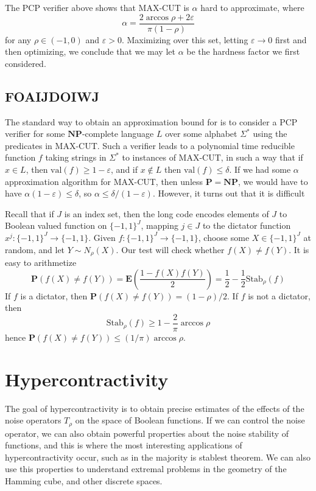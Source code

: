 The PCP verifier above shows that MAX-CUT is $\alpha$ hard to approximate, where
%
\[ \alpha = \frac{2 \arccos \rho + 2\varepsilon}{\pi(1 - \rho)} \]
%
for any $\rho \in (-1,0)$ and $\varepsilon > 0$. Maximizing over this set, letting $\varepsilon \to 0$ first and then optimizing, we conclude that we may let $\alpha$ be the hardness factor we first considered.


\section{FOAIJDOIWJ}

The standard way to obtain an approximation bound for is to consider a PCP verifier for some $\mathbf{NP}$-complete language $L$ over some alphabet $\Sigma^*$ using the predicates in MAX-CUT. Such a verifier leads to a polynomial time reducible function $f$ taking strings in $\Sigma^*$ to instances of MAX-CUT, in such a way that if $x \in L$, then $\text{val}(f) \geq 1 - \varepsilon$, and if $x \not \in L$ then $\text{val}(f) \leq \delta$. If we had some $\alpha$ approximation algorithm for MAX-CUT, then unless $\mathbf{P} = \mathbf{NP}$, we would have to have $\alpha (1 - \varepsilon) \leq \delta$, so $\alpha \leq \delta/(1-\varepsilon)$. However, it turns out that it is difficult

Recall that if $J$ is an index set, then the long code encodes elements of $J$ to Boolean valued function on $\{ -1, 1 \}^J$, mapping $j \in J$ to the dictator function $x^j: \{ -1, 1 \}^J \to \{ -1, 1 \}$. Given $f: \{ -1, 1 \}^J \to \{ -1, 1 \}$, choose some $X \in \{ -1, 1 \}^J$ at random, and let $Y \sim N_{\rho}(X)$. Our test will check whether $f(X) \neq f(Y)$. It is easy to arithmetize
%
\[ \mathbf{P}(f(X) \neq f(Y)) = \mathbf{E} \left( \frac{1 - f(X)f(Y)}{2} \right) = \frac{1}{2} - \frac{1}{2} \text{Stab}_\rho(f) \]
%
If $f$ is a dictator, then $\mathbf{P}(f(X) \neq f(Y)) = (1 - \rho)/2$. If $f$ is not a dictator, then
%
\[ \text{Stab}_\rho(f) \geq 1 - \frac{2}{\pi} \arccos \rho \]
%
hence $\mathbf{P}(f(X) \neq f(Y)) \leq (1/\pi) \arccos \rho$.






\chapter{Hypercontractivity}

The goal of hypercontractivity is to obtain precise estimates of the effects of the noise operators $T_\rho$ on the space of Boolean functions. If we can control the noise operator, we can also obtain powerful properties about the noise stability of functions, and this is where the most interesting applications of hypercontractivity occur, such as in the majority is stablest theorem. We can also use this properties to understand extremal problems in the geometry of the Hamming cube, and other discrete spaces.

